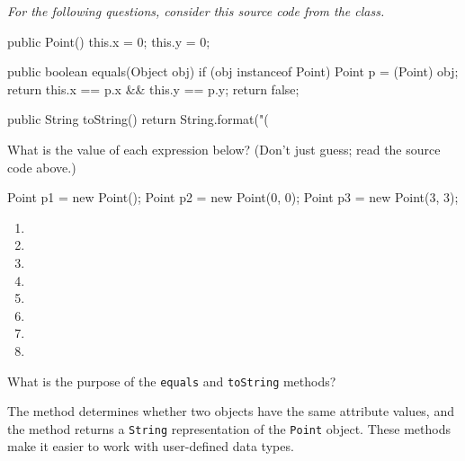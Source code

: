 \vspace{2em}
\hrulefill

\vspace{1ex}
\textit{For the following questions, consider this source code from the  class.}
\vspace{1ex}

\begin{javalst}
    public Point() {
        this.x = 0;
        this.y = 0;
    }

    public boolean equals(Object obj) {
        if (obj instanceof Point) {
            Point p = (Point) obj;
            return this.x == p.x && this.y == p.y;
        }
        return false;
    }

    public String toString() {
        return String.format("(%
    }
\end{javalst}



\Q \label{expr}
What is the value of each expression below? (Don't just guess; read the source code above.)
\begin{javalst}
Point p1 = new Point();  Point p2 = new Point(0, 0);  Point p3 = new Point(3, 3);
\end{javalst}

\begin{multicols}{2}
\begin{enumerate}
\item {} 
\item {} 
\item {} 
\item {} 
\item {} 
\item {} 
\item {} 
\item {} 
\end{enumerate}
\end{multicols}


\Q What is the purpose of the \texttt{equals} and \texttt{toString} methods?

\begin{answer}[5em]
The  method determines whether two objects have the same attribute values, and the  method returns a \texttt{String} representation of the \texttt{Point} object.
These methods make it easier to work with user-defined data types.
\end{answer}


